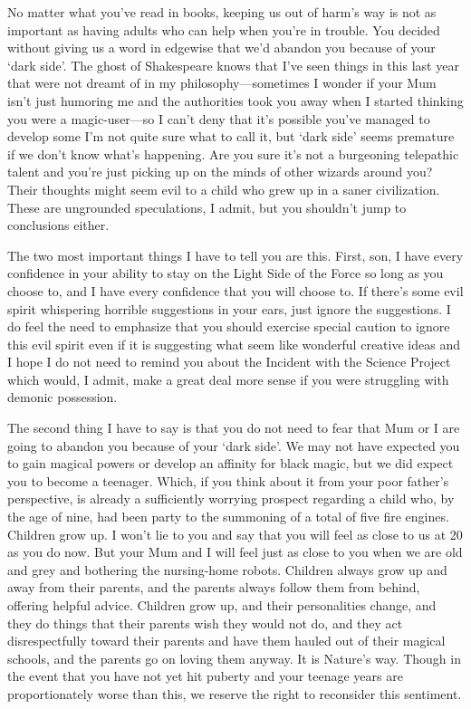 \begin{writtenNote}

No matter what you've read in books, keeping us out of harm's way is
not as important as having adults who can help when you're in
trouble. You decided without giving us a word in edgewise that we'd abandon you
because of your `dark side'. The ghost of Shakespeare knows that I've seen
things in this last year that were not dreamt of in my philosophy—sometimes I
wonder if your Mum isn't just humoring me and the authorities took you away
when I started thinking you were a magic-user—so I can't deny that it's
possible you've managed to develop some{\el} I'm not quite sure
what to call it, but `dark side' seems premature if we don't know what's
happening. Are you sure it's not a burgeoning telepathic talent and you're just
picking up on the minds of other wizards around you? Their thoughts might seem
evil to a child who grew up in a saner civilization. These are ungrounded
speculations, I admit, but you shouldn't jump to conclusions either.

The two most important things I have to tell you are this. First, son, I
have every confidence in your ability to stay on the Light Side of
the Force so long as you choose to, and I have every confidence that you will
choose to. If there's some evil spirit whispering horrible suggestions in your
ears, just ignore the suggestions. I do feel the need to emphasize
that you should exercise special caution to ignore this evil spirit even if it
is suggesting what seem like wonderful creative ideas and I hope I do not need
to remind you about the Incident with the Science Project which would, I admit,
make a great deal more sense if you were struggling with demonic possession.

The second thing I have to say is that you do not need to fear that Mum
or I are going to abandon you because of your `dark side'. We may not have
expected you to gain magical powers or develop an affinity for black magic, but
we did expect you to become a teenager. Which, if you think about it from your
poor father's perspective, is already a sufficiently worrying prospect
regarding a child who, by the age of nine, had been party to the summoning of a
total of five fire engines. Children grow up. I won't lie to you and say that
you will feel as close to us at 20 as you do now. But your Mum and I will feel
just as close to you when we are old and grey and bothering the nursing-home
robots. Children always grow up and away from their parents, and the parents
always follow them from behind, offering helpful advice. Children grow up, and
their personalities change, and they do things that their parents wish they
would not do, and they act disrespectfully toward their parents and have them
hauled out of their magical schools, and the parents go on loving them anyway.
It is Nature's way. Though in the event that you have not yet hit puberty and
your teenage years are proportionately worse than this, we reserve the right to
reconsider this sentiment.


\end{writtenNote}
